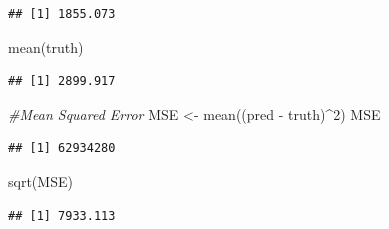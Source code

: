 \documentclass[
]{article}
\newenvironment{Shaded}{\begin{snugshade}}{\end{snugshade}}
\newcommand{\AttributeTok}[1]{\textcolor[rgb]{0.77,0.63,0.00}{#1}}
\newcommand{\CommentTok}[1]{\textcolor[rgb]{0.56,0.35,0.01}{\textit{#1}}}
\newcommand{\DecValTok}[1]{\textcolor[rgb]{0.00,0.00,0.81}{#1}}
\newcommand{\FunctionTok}[1]{\textcolor[rgb]{0.00,0.00,0.00}{#1}}
\newcommand{\NormalTok}[1]{#1}
\newcommand{\OtherTok}[1]{\textcolor[rgb]{0.56,0.35,0.01}{#1}}
\newcommand{\SpecialCharTok}[1]{\textcolor[rgb]{0.00,0.00,0.00}{#1}}
\begin{document}
\begin{Shaded}
\end{Shaded}

\begin{verbatim}
## [1] 1855.073
\end{verbatim}

\begin{Shaded}
\begin{Highlighting}[]
\FunctionTok{mean}\NormalTok{(truth)}
\end{Highlighting}
\end{Shaded}

\begin{verbatim}
## [1] 2899.917
\end{verbatim}

\begin{Shaded}
\begin{Highlighting}[]
\CommentTok{\#Mean Squared Error}
\NormalTok{MSE }\OtherTok{\textless{}{-}} \FunctionTok{mean}\NormalTok{((pred }\SpecialCharTok{{-}}\NormalTok{ truth)}\SpecialCharTok{\^{}}\DecValTok{2}\NormalTok{)}
\NormalTok{MSE}
\end{Highlighting}
\end{Shaded}

\begin{verbatim}
## [1] 62934280
\end{verbatim}

\begin{Shaded}
\begin{Highlighting}[]
\FunctionTok{sqrt}\NormalTok{(MSE)}
\end{Highlighting}
\end{Shaded}

\begin{verbatim}
## [1] 7933.113
\end{verbatim}
\end{document}
